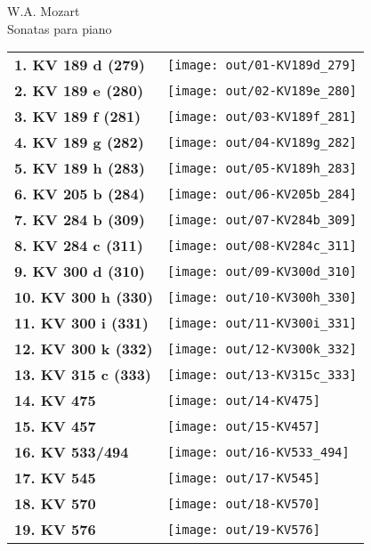 \documentclass[a4paper,13pt,oneside,headinclude,titlepage]{article} %
\newcommand{\imgw}{0.67}
\newlength{\colw}
\newcommand{\tn}{\tabularnewline}
\begin{document}
\begin{center}
\vfill
{\huge W.A. Mozart}\\[1ex]
{\huge Sonatas para piano}\\[1ex]
\vfill
\begin{tabular}{>{\bfseries}m{2.8cm}m{\colw}}
1. KV 189 d (279)&\texttt{[image: out/01-KV189d\_279]}\tn
2. KV 189 e (280)&\texttt{[image: out/02-KV189e\_280]}\tn
3. KV 189 f (281)&\texttt{[image: out/03-KV189f\_281]}\tn
4. KV 189 g (282)&\texttt{[image: out/04-KV189g\_282]}\tn
5. KV 189 h (283)&\texttt{[image: out/05-KV189h\_283]}\tn
6. KV 205 b (284)&\texttt{[image: out/06-KV205b\_284]}\tn
7. KV 284 b (309)&\texttt{[image: out/07-KV284b\_309]}\tn
8. KV 284 c (311)&\texttt{[image: out/08-KV284c\_311]}\tn
9. KV 300 d (310)&\texttt{[image: out/09-KV300d\_310]}\tn
10. KV 300 h (330)&\texttt{[image: out/10-KV300h\_330]}\tn
11. KV 300 i (331)&\texttt{[image: out/11-KV300i\_331]}\tn
12. KV 300 k (332)&\texttt{[image: out/12-KV300k\_332]}\tn
13. KV 315 c (333)&\texttt{[image: out/13-KV315c\_333]}\tn
14. KV 475&\texttt{[image: out/14-KV475]}\tn
15. KV 457&\texttt{[image: out/15-KV457]}\tn
16. KV 533/494&\texttt{[image: out/16-KV533\_494]}\tn
17. KV 545&\texttt{[image: out/17-KV545]}\tn
18. KV 570&\texttt{[image: out/18-KV570]}\tn
19. KV 576&\texttt{[image: out/19-KV576]}\tn
\end{tabular}
\end{center}
\vfill
\end{document}

